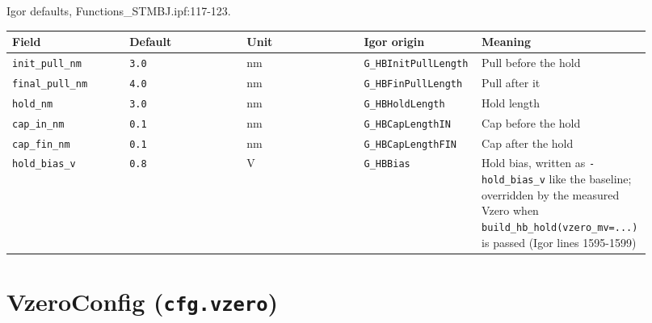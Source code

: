 Igor defaults, Functions\_STMBJ.ipf:117-123.

\footnotesize\setlength{\LTleft}{0pt}\setlength{\LTright}{\fill}
\begin{longtable}{@{}>{\raggedright\arraybackslash}p{0.184\linewidth}>{\raggedright\arraybackslash}p{0.184\linewidth}>{\raggedright\arraybackslash}p{0.184\linewidth}>{\raggedright\arraybackslash}p{0.184\linewidth}>{\raggedright\arraybackslash}p{0.184\linewidth}@{}}
\toprule
\textbf{Field} & \textbf{Default} & \textbf{Unit} & \textbf{Igor origin} & \textbf{Meaning} \\
\midrule\endhead
\texttt{init\_\discretionary{}{}{}pull\_\discretionary{}{}{}nm} & \texttt{3.\discretionary{}{}{}0} & nm & \texttt{G\_\discretionary{}{}{}HBInit\discretionary{}{}{}Pull\discretionary{}{}{}Length} & Pull before the hold \\
\texttt{final\_\discretionary{}{}{}pull\_\discretionary{}{}{}nm} & \texttt{4.\discretionary{}{}{}0} & nm & \texttt{G\_\discretionary{}{}{}HBFin\discretionary{}{}{}Pull\discretionary{}{}{}Length} & Pull after it \\
\texttt{hold\_\discretionary{}{}{}nm} & \texttt{3.\discretionary{}{}{}0} & nm & \texttt{G\_\discretionary{}{}{}HBHold\discretionary{}{}{}Length} & Hold length \\
\texttt{cap\_\discretionary{}{}{}in\_\discretionary{}{}{}nm} & \texttt{0.\discretionary{}{}{}1} & nm & \texttt{G\_\discretionary{}{}{}HBCap\discretionary{}{}{}Length\discretionary{}{}{}IN} & Cap before the hold \\
\texttt{cap\_\discretionary{}{}{}fin\_\discretionary{}{}{}nm} & \texttt{0.\discretionary{}{}{}1} & nm & \texttt{G\_\discretionary{}{}{}HBCap\discretionary{}{}{}Length\discretionary{}{}{}FIN} & Cap after the hold \\
\texttt{hold\_\discretionary{}{}{}bias\_\discretionary{}{}{}v} & \texttt{0.\discretionary{}{}{}8} & V & \texttt{G\_\discretionary{}{}{}HBBias} & Hold bias, written as \texttt{-hold\_\discretionary{}{}{}bias\_\discretionary{}{}{}v} like the baseline; overridden by the measured Vzero when \texttt{build\_\discretionary{}{}{}hb\_\discretionary{}{}{}hold(vzero\_\discretionary{}{}{}mv=.\discretionary{}{}{}.\discretionary{}{}{}.\discretionary{}{}{})} is passed (Igor lines 1595-1599) \\
\bottomrule
\end{longtable}
\normalsize

\section{VzeroConfig (\texttt{cfg.\discretionary{}{}{}vzero})}

